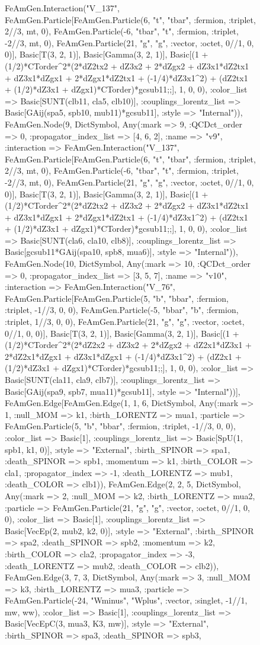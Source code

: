 \documentclass{revtex4}
\begin{document}
\begin{figure}[!htb]
\begin{center}
{FeAmGen.Interaction("V_137", FeAmGen.Particle[FeAmGen.Particle(6, "t", "tbar", :fermion, :triplet, 2//3, mt, 0), FeAmGen.Particle(-6, "tbar", "t", :fermion, :triplet, -2//3, mt, 0), FeAmGen.Particle(21, "g", "g", :vector, :octet, 0//1, 0, 0)], Basic[T(3, 2, 1)], Basic[Gamma(3, 2, 1)], Basic[(1 + (1/2)*CTorder^2*(2*dZ2tx2 + dZ3x2 + 2*dZgx2 + dZ3x1*dZ2tx1 + dZ3x1*dZgx1 + 2*dZgx1*dZ2tx1 + (-1/4)*dZ3x1^2) + (dZ2tx1 + (1/2)*dZ3x1 + dZgx1)*CTorder)*gcsub11;;], 1, 0, 0), :color_list => Basic[SUNT(clb11, cla5, clb10)], :couplings_lorentz_list => Basic[GAij(spa5, spb10, mub11)*gcsub11], :style => "Internal")), FeAmGen.Node(9, Dict{Symbol, Any}(:mark => 9, :QCDct_order => 0, :propagator_index_list => [4, 6, 2], :name => "v9", :interaction => FeAmGen.Interaction("V_137", FeAmGen.Particle[FeAmGen.Particle(6, "t", "tbar", :fermion, :triplet, 2//3, mt, 0), FeAmGen.Particle(-6, "tbar", "t", :fermion, :triplet, -2//3, mt, 0), FeAmGen.Particle(21, "g", "g", :vector, :octet, 0//1, 0, 0)], Basic[T(3, 2, 1)], Basic[Gamma(3, 2, 1)], Basic[(1 + (1/2)*CTorder^2*(2*dZ2tx2 + dZ3x2 + 2*dZgx2 + dZ3x1*dZ2tx1 + dZ3x1*dZgx1 + 2*dZgx1*dZ2tx1 + (-1/4)*dZ3x1^2) + (dZ2tx1 + (1/2)*dZ3x1 + dZgx1)*CTorder)*gcsub11;;], 1, 0, 0), :color_list => Basic[SUNT(cla6, cla10, clb8)], :couplings_lorentz_list => Basic[gcsub11*GAij(spa10, spb8, mua6)], :style => "Internal")), FeAmGen.Node(10, Dict{Symbol, Any}(:mark => 10, :QCDct_order => 0, :propagator_index_list => [3, 5, 7], :name => "v10", :interaction => FeAmGen.Interaction("V_76", FeAmGen.Particle[FeAmGen.Particle(5, "b", "bbar", :fermion, :triplet, -1//3, 0, 0), FeAmGen.Particle(-5, "bbar", "b", :fermion, :triplet, 1//3, 0, 0), FeAmGen.Particle(21, "g", "g", :vector, :octet, 0//1, 0, 0)], Basic[T(3, 2, 1)], Basic[Gamma(3, 2, 1)], Basic[(1 + (1/2)*CTorder^2*(2*dZ2x2 + dZ3x2 + 2*dZgx2 + dZ2x1*dZ3x1 + 2*dZ2x1*dZgx1 + dZ3x1*dZgx1 + (-1/4)*dZ3x1^2) + (dZ2x1 + (1/2)*dZ3x1 + dZgx1)*CTorder)*gcsub11;;], 1, 0, 0), :color_list => Basic[SUNT(cla11, cla9, clb7)], :couplings_lorentz_list => Basic[GAij(spa9, spb7, mua11)*gcsub11], :style => "Internal"))], FeAmGen.Edge[FeAmGen.Edge(1, 1, 6, Dict{Symbol, Any}(:mark => 1, :null_MOM => k1, :birth_LORENTZ => mua1, :particle => FeAmGen.Particle(5, "b", "bbar", :fermion, :triplet, -1//3, 0, 0), :color_list => Basic[1], :couplings_lorentz_list => Basic[SpU(1, spb1, k1, 0)], :style => "External", :birth_SPINOR => spa1, :death_SPINOR => spb1, :momentum => k1, :birth_COLOR => cla1, :propagator_index => -1, :death_LORENTZ => mub1, :death_COLOR => clb1)), FeAmGen.Edge(2, 2, 5, Dict{Symbol, Any}(:mark => 2, :null_MOM => k2, :birth_LORENTZ => mua2, :particle => FeAmGen.Particle(21, "g", "g", :vector, :octet, 0//1, 0, 0), :color_list => Basic[1], :couplings_lorentz_list => Basic[VecEp(2, mub2, k2, 0)], :style => "External", :birth_SPINOR => spa2, :death_SPINOR => spb2, :momentum => k2, :birth_COLOR => cla2, :propagator_index => -3, :death_LORENTZ => mub2, :death_COLOR => clb2)), FeAmGen.Edge(3, 7, 3, Dict{Symbol, Any}(:mark => 3, :null_MOM => k3, :birth_LORENTZ => mua3, :particle => FeAmGen.Particle(-24, "Wminus", "Wplus", :vector, :singlet, -1//1, mw, ww), :color_list => Basic[1], :couplings_lorentz_list => Basic[VecEpC(3, mua3, K3, mw)], :style => "External", :birth_SPINOR => spa3, :death_SPINOR => spb3, }
\end{center}
\end{figure}
\end{document}
